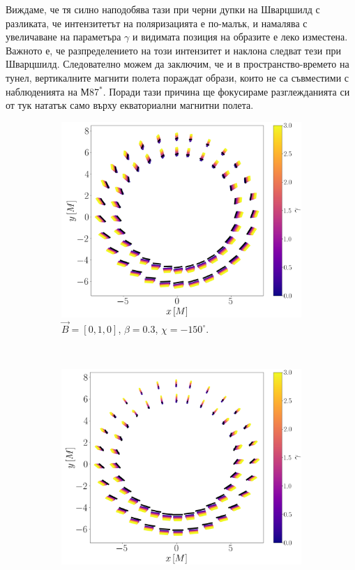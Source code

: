 Виждаме, че тя силно наподобява тази при черни дупки на Шварцшилд с разликата, че интензитетът на поляризацията е по-малък, и намалява с увеличаване на параметъра $\gamma$ и видимата позиция на образите е леко изместена. Важното е, че разпределението на този интензитет и наклона следват тези при Шварцшилд. Следователно можем да заключим, че и в пространство-времето на тунел, вертикалните магнити полета пораждат образи, които не са съвместими с наблюденията на М87$^*$. Поради тази причина ще фокусираме разглежданията си от тук нататък само върху екваториални магнитни полета. \newpage

\begin{figure}[!htb]
	\begin{subfigure}{8cm}
		\includegraphics[scale = 0.2]{WH_alpha_Vert_Field.png}
		\caption{$\vec{B} = [0, 1, 0]$, $\beta = 0.3$, $\chi = -150^\circ$.} 
	\end{subfigure}\,\,\,
	\begin{subfigure}{8cm}
		\includegraphics[scale = 0.2]{WH_alpha_Vert_Field_beta_zero.png}

\end{subfigure}
\end{figure}
